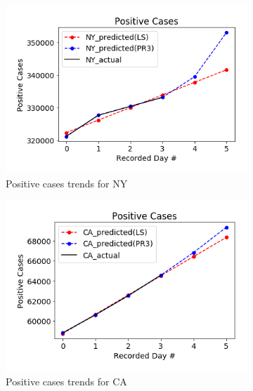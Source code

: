 \documentclass[11pt]{article}
\begin{document}
\begin{figure}[h]
     \centering
     \begin{subfigure}[b]{0.49\textwidth}
         \centering
         \includegraphics[width=\textwidth]{diagrams/analysis/positive_trend_NY.png}
         \caption{Positive cases trends for NY}
     \end{subfigure}
     \begin{subfigure}[b]{0.49\textwidth}
         \centering
         \includegraphics[width=\textwidth]{diagrams/analysis/positive_trend_CA.png}
         \caption{Positive cases trends for CA}
     \end{subfigure}
        \label{fig:three graphs}
             \begin{subfigure}[b]{0.49\textwidth}
         \centering

\end{subfigure}
\end{figure}
\end{document}
